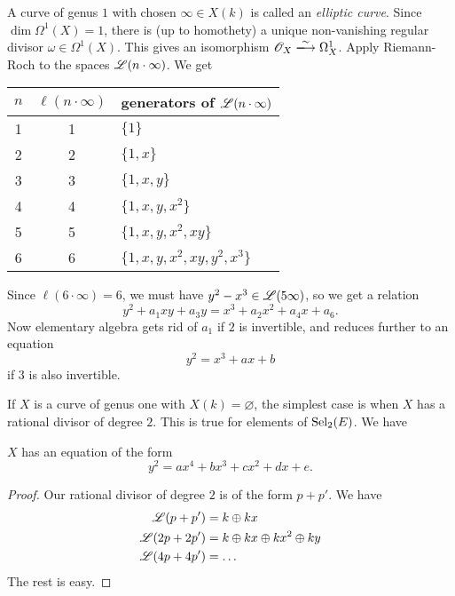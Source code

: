 \begin{example}
A curve of genus $1$ with chosen $\infty\in X(k)$ is called an \emph{elliptic 
curve}. Since $\dim \Omega^1(X)=1$, there is (up to homothety) a unique 
non-vanishing regular divisor $\omega\in \Omega^1(X)$. This gives an 
isomorphism $\sO_X\iso \Omega_X^1$. Apply Riemann-Roch to the spaces 
$\mathscr{L}(n\cdot \infty)$. We get 
\begin{center}
\begin{tabular}{c|cl}
$n$ & $\ell(n\cdot \infty)$ & generators of $\mathscr{L}(n\cdot\infty)$ \\ \hline
1 & 1 & $\{1\}$ \\
2 & 2 & $\{1,x\}$ \\
3 & 3 & $\{1,x,y\}$ \\
4 & 4 & $\{1,x,y,x^2\}$ \\
5 & 5 & $\{1,x,y,x^2,x y\}$ \\
6 & 6 & $\{1,x,y,x^2,x y,y^2, x^3\}$
\end{tabular}
\end{center}
Since $\ell(6\cdot \infty)=6$, we must have $y^2-x^3\in \mathscr{L}(5\infty)$, 
so we get a relation 
\[
  y^2 + a_1 x y + a_3 y = x^3 + a_2 x^2 + a_4 x + a_6 .
\]
Now elementary algebra gets rid of $a_1$ if $2$ is invertible, and reduces 
further to an equation 
\[
  y^2 = x^3 + a x+b 
\]
if $3$ is also invertible. 
\end{example}

If $X$ is a curve of genus one with $X(k)=\varnothing$, the simplest case is 
when $X$ has a rational divisor of degree $2$. This is true for elements of 
$\operatorname{Sel}_2(E)$. We have 

\begin{theo}
$X$ has an equation of the form 
\[
  y^2 = a x^4 + b x^3 + c x^2 + d x+e .
\]
\end{theo}
\begin{proof}
Our rational divisor of degree $2$ is of the form $p+p'$. We have 
\begin{align*}
  \mathscr{L}(p+p') &= k\oplus k x \\
  \mathscr{L}(2 p+2 p') &= k\oplus k x\oplus k x^2\oplus k y \\
  \mathscr{L}(4 p+4 p') &= \ldots 
\end{align*}
The rest is easy. 
\end{proof}




